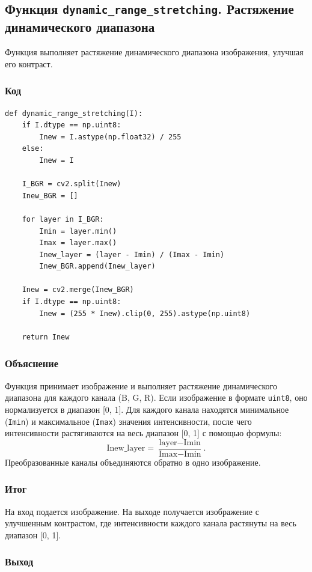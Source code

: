 \documentclass[a4paper,12pt]{article}
\begin{document}
\subsection{Функция \texttt{dynamic\_range\_stretching}. Растяжение динамического диапазона}

Функция выполняет растяжение динамического диапазона изображения, улучшая его контраст.

\subsubsection{Код}
\begin{verbatim}
def dynamic_range_stretching(I):
    if I.dtype == np.uint8:
        Inew = I.astype(np.float32) / 255
    else:
        Inew = I
    
    I_BGR = cv2.split(Inew)
    Inew_BGR = []
    
    for layer in I_BGR:
        Imin = layer.min()
        Imax = layer.max()
        Inew_layer = (layer - Imin) / (Imax - Imin)
        Inew_BGR.append(Inew_layer)
    
    Inew = cv2.merge(Inew_BGR)
    if I.dtype == np.uint8:
        Inew = (255 * Inew).clip(0, 255).astype(np.uint8)
    
    return Inew
\end{verbatim}

\subsubsection{Объяснение}
Функция принимает изображение и выполняет растяжение динамического диапазона для каждого канала (B, G, R). Если изображение в формате \texttt{uint8}, оно нормализуется в диапазон [0, 1]. Для каждого канала находятся минимальное (\texttt{Imin}) и максимальное (\texttt{Imax}) значения интенсивности, после чего интенсивности растягиваются на весь диапазон [0, 1] с помощью формулы:
\[
\text{Inew\_layer} = \frac{\text{layer} - \text{Imin}}{\text{Imax} - \text{Imin}}.
\]
Преобразованные каналы объединяются обратно в одно изображение.

\subsubsection{Итог}
На вход подается изображение. На выходе получается изображение с улучшенным контрастом, где интенсивности каждого канала растянуты на весь диапазон [0, 1].


\subsubsection{Выход}
\end{document}

